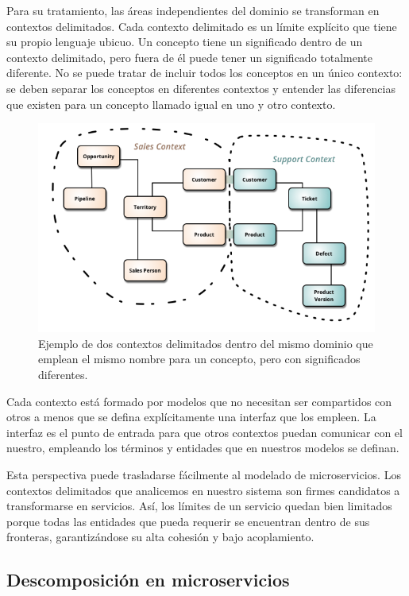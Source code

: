\documentclass[11pt,spanish,listoffigures,listoftables]{tfgetsinf}
\begin{document}
Para su tratamiento, las áreas independientes del dominio se transforman en contextos delimitados. Cada contexto delimitado es un límite explícito que tiene su propio lenguaje ubicuo. Un concepto tiene un significado dentro de un contexto delimitado, pero fuera de él puede tener un significado totalmente diferente. No se puede tratar de incluir todos los conceptos en un único contexto: se deben separar los conceptos en diferentes contextos y entender las diferencias que existen para un concepto llamado igual en uno y otro contexto.

\begin{figure}[h]
\centering
\includegraphics[scale=0.8]{bounded_contexts}
\caption{Ejemplo de dos contextos delimitados dentro del mismo dominio que emplean el mismo nombre para un concepto, pero con significados diferentes. \cite{Fowler}}
\end{figure}

Cada contexto está formado por modelos que no necesitan ser compartidos con otros a menos que se defina explícitamente una interfaz que los empleen. La interfaz es el punto de entrada para que otros contextos puedan comunicar con el nuestro, empleando los términos y entidades que en nuestros modelos se definan.

Esta perspectiva puede trasladarse fácilmente al modelado de microservicios. Los contextos delimitados que analicemos en nuestro sistema son firmes candidatos a transformarse en servicios. Así, los límites de un servicio quedan bien limitados porque  todas las entidades que pueda requerir se encuentran dentro de sus fronteras, garantizándose su alta cohesión y bajo acoplamiento. \cite{Newman2015a}

\subsection{Descomposición en microservicios}
\end{document}
